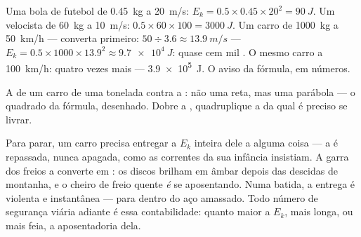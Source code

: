\begin{example}\label{ex:g9:kinetic-energy-safety:first}
Uma bola de futebol de \qty{0.45}{kg} a \qty{20}{m/s}:
$E_k = 0.5 \times 0.45 \times 20^2 = \qty{90}{J}$. Um velocista de
\qty{60}{kg} a \qty{10}{m/s}:
$0.5 \times 60 \times 100 = \qty{3000}{J}$. Um carro de
\qty{1000}{kg} a \qty{50}{km/h} --- converta primeiro:
$50 \div 3.6 \approx \qty{13.9}{m/s}$ ---
$E_k = 0.5 \times 1000 \times 13.9^2 \approx \qty{9.7e4}{J}$: quase
cem mil . O mesmo carro a \qty{100}{km/h}: quatro vezes mais
--- \qty{3.9e5}{J}. O aviso da fórmula, em números.
\end{example}

\begin{omfigure}

{\small A  de um carro de uma tonelada contra a
: não uma reta, mas uma parábola --- o quadrado da fórmula,
desenhado. Dobre a , quadruplique a  da qual é
preciso se livrar.}
\end{omfigure}

\begin{example}\label{ex:g9:kinetic-energy-safety:brakes}
Para parar, um carro precisa entregar a $E_k$ inteira dele a alguma
coisa --- a  é repassada, nunca apagada, como as correntes da
sua infância insistiam. A garra dos freios a converte em : os
discos brilham em âmbar depois das descidas de montanha, e o cheiro
de freio quente \emph{é}  se aposentando. Numa
batida, a entrega é violenta e instantânea --- para dentro do aço
amassado. Todo número de segurança viária adiante é essa
contabilidade: quanto maior a $E_k$, mais longa, ou mais feia, a
aposentadoria dela.
\end{example}

